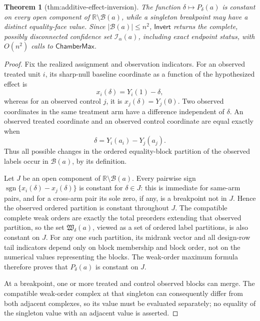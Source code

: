 \documentclass{article}
\newtheorem{theorem}{Theorem}
\begin{document}
\begin{theorem}[thm:additive-effect-inversion]\label{thm:additive-effect-inversion}
The function \(\delta\mapsto P_\delta(a)\) is constant on every open component of \(\mathbb R\setminus\mathcal B(a)\), while a singleton breakpoint may have a distinct equality-face value. Since \(|\mathcal B(a)|\le n^2\), \(\mathsf{Invert}\) returns the complete, possibly disconnected confidence set \(\mathcal I_\alpha(a)\), including exact endpoint status, with \(O(n^2)\) calls to \(\mathsf{ChamberMax}\).
\end{theorem}
\begin{proof}
Fix the realized assignment and observation indicators.  For an observed treated unit \(i\), its sharp-null baseline coordinate as a function of the hypothesized effect is
\[
x_i(\delta)=Y_i(1)-\delta,
\]
whereas for an observed control \(j\), it is \(x_j(\delta)=Y_j(0)\).  Two observed coordinates in the same treatment arm have a difference independent of \(\delta\).  An observed treated coordinate and an observed control coordinate are equal exactly when
\[
\delta=Y_i(a_i)-Y_j(a_j).
\]
Thus all possible changes in the ordered equality-block partition of the observed labels occur in \(\mathcal B(a)\), by its definition.

Let \(J\) be an open component of \(\mathbb R\setminus\mathcal B(a)\).  Every pairwise sign \(\operatorname{sgn}\{x_i(\delta)-x_j(\delta)\}\) is constant for \(\delta\in J\): this is immediate for same-arm pairs, and for a cross-arm pair its sole zero, if any, is a breakpoint not in \(J\).  Hence the observed ordered partition is constant throughout \(J\).  The compatible complete weak orders are exactly the total preorders extending that observed partition, so the set \(\mathfrak W_\delta(a)\), viewed as a set of ordered label partitions, is also constant on \(J\).  For any one such partition, its midrank vector and all design-row tail indicators depend only on block membership and block order, not on the numerical values representing the blocks.  The weak-order maximum formula therefore proves that \(P_\delta(a)\) is constant on \(J\).

At a breakpoint, one or more treated and control observed blocks can merge.  The compatible weak-order complex at that singleton can consequently differ from both adjacent complexes, so its value must be evaluated separately; no equality of the singleton value with an adjacent value is asserted.


\end{proof}
\end{document}
